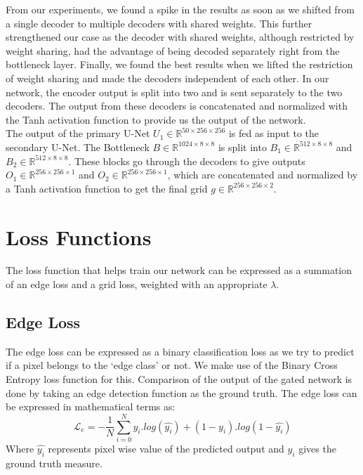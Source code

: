 \documentclass[a4paper,conference]{IEEEtran}
\begin{document}
	From our experiments, we found a spike in the results as soon as we shifted from a single decoder to multiple decoders with shared weights. This further strengthened our case as the decoder with shared weights, although restricted by weight sharing, had the advantage of being decoded separately right from the bottleneck layer. Finally, we found the best results when we lifted the restriction of weight sharing and made the decoders independent of each other. In our network, the encoder output is split into two and is sent separately to the two decoders. The output from these decoders is concatenated and normalized with the Tanh activation function to provide us the output of the network.
	\\
	
	The output of the primary U-Net $U_{1}\in \mathbb{R} ^{50\times256\times256}$ is fed as input to the secondary U-Net. The Bottleneck $B\in \mathbb{R} ^{1024\times8\times8}$ is split into $B_{1}\in \mathbb{R} ^{512\times8\times8}$ and $B_{2}\in \mathbb{R} ^{512\times8\times8}$. These blocks go through the decoders to give outputs $O_{1}\in \mathbb{R} ^{256\times256\times1}$ and $O_{2}\in \mathbb{R} ^{256\times256\times1}$, which are concatenated and normalized by a Tanh activation function to get the final grid $g\in \mathbb{R} ^{256\times256\times2}$.
	
	
	\section{Loss Functions}
	
	The loss function that helps train our network can be expressed as a summation of an edge loss and a grid loss, weighted with an appropriate $\lambda$.
	
	\subsection{Edge Loss}
	The edge loss can be expressed as a binary classification loss as we try to predict if a pixel belongs to the `edge class' or not. We make use of the Binary Cross Entropy loss function for this. Comparison of the output of the gated network is done by taking an edge detection function as the ground truth. The edge loss can be expressed in mathematical terms as:
	\[
	\mathcal{L}_{e}=-\frac{1}{N}\sum_{i=0}^{N}y_i.log(\hat{y_{i}})+(1-y_{i}).log(1-\hat{y_{i}})
	\]
	Where $\hat{y_{i}}$ represents pixel wise value of the predicted output and $y_{i}$ gives the ground truth measure.
\end{document}
